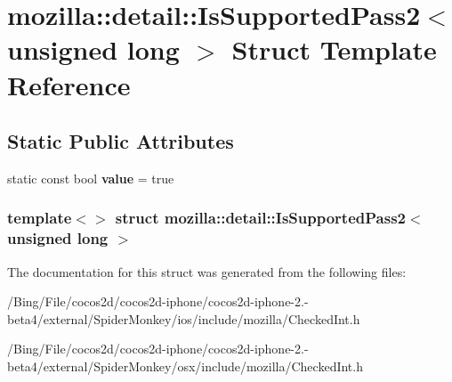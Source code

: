 \hypertarget{structmozilla_1_1detail_1_1_is_supported_pass2_3_01unsigned_01long_01_4}{\section{mozilla\-:\-:detail\-:\-:Is\-Supported\-Pass2$<$ unsigned long $>$ Struct Template Reference}
\label{structmozilla_1_1detail_1_1_is_supported_pass2_3_01unsigned_01long_01_4}
}
\subsection*{Static Public Attributes}
\begin{DoxyCompactItemize}
\item 
\hypertarget{structmozilla_1_1detail_1_1_is_supported_pass2_3_01unsigned_01long_01_4_aada795d33f109be7cbe457aa0a4dd9a6}{static const bool {\bfseries value} = true}\label{structmozilla_1_1detail_1_1_is_supported_pass2_3_01unsigned_01long_01_4_aada795d33f109be7cbe457aa0a4dd9a6}

\end{DoxyCompactItemize}
\subsubsection*{template$<$$>$ struct mozilla\-::detail\-::\-Is\-Supported\-Pass2$<$ unsigned long $>$}



The documentation for this struct was generated from the following files\-:\begin{DoxyCompactItemize}
\item 
/\-Bing/\-File/cocos2d/cocos2d-\/iphone/cocos2d-\/iphone-\/2.-\/beta4/external/\-Spider\-Monkey/ios/include/mozilla/Checked\-Int.\-h\item 
/\-Bing/\-File/cocos2d/cocos2d-\/iphone/cocos2d-\/iphone-\/2.-\/beta4/external/\-Spider\-Monkey/osx/include/mozilla/Checked\-Int.\-h\end{DoxyCompactItemize}
